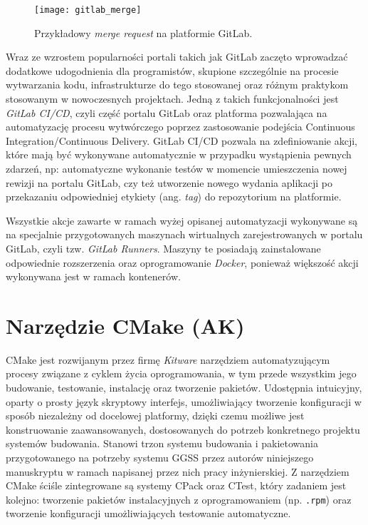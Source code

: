 \begin{figure}[H]
    \centering
    \texttt{[image: gitlab\_merge]}
    \caption{Przykładowy \emph{merge request} na platformie GitLab.}
    \label{fig:merge}
\end{figure}

Wraz ze wzrostem popularności portali takich jak GitLab zaczęto wprowadzać dodatkowe udogodnienia dla programistów, skupione szczególnie na procesie wytwarzania kodu, infrastrukturze do tego stosowanej oraz różnym praktykom stosowanym w nowoczesnych projektach. Jedną z takich funkcjonalności jest \emph{GitLab CI/CD}, czyli część portalu GitLab oraz platforma pozwalająca na automatyzację procesu wytwórczego poprzez zastosowanie podejścia Continuous Integration/Continuous Delivery. GitLab CI/CD pozwala na zdefiniowanie akcji, które mają być wykonywane automatycznie w przypadku wystąpienia pewnych zdarzeń, np: automatyczne wykonanie testów w momencie umieszczenia nowej rewizji na portalu GitLab, czy też utworzenie nowego wydania aplikacji po przekazaniu odpowiedniej etykiety (ang. \emph{tag}) do repozytorium na platformie.

Wszystkie akcje zawarte w ramach wyżej opisanej automatyzacji wykonywane są na specjalnie przygotowanych maszynach wirtualnych zarejestrowanych w portalu GitLab, czyli tzw. \emph{GitLab Runners}. Maszyny te posiadają zainstalowane odpowiednie rozszerzenia oraz oprogramowanie \emph{Docker}, ponieważ większość akcji wykonywana jest w ramach kontenerów.


\section{Narzędzie CMake (AK)}
CMake jest rozwijanym przez firmę \emph{Kitware} narzędziem automatyzującym procesy związane z cyklem życia oprogramowania, w tym przede wszystkim jego budowanie, testowanie, instalację oraz tworzenie pakietów. Udostępnia intuicyjny, oparty o prosty język skryptowy interfejs, umożliwiający tworzenie konfiguracji w sposób niezależny od docelowej platformy, dzięki czemu możliwe jest konstruowanie zaawansowanych, dostosowanych do potrzeb konkretnego projektu systemów budowania. Stanowi trzon systemu budowania i pakietowania przygotowanego na potrzeby systemu GGSS przez autorów niniejszego manuskryptu w ramach napisanej przez nich pracy inżynierskiej. Z narzędziem CMake ściśle zintegrowane są systemy CPack oraz CTest, który zadaniem jest kolejno: tworzenie pakietów instalacyjnych z oprogramowaniem (np. \lstinline{.rpm}) oraz tworzenie konfiguracji umożliwiających testowanie automatyczne.

